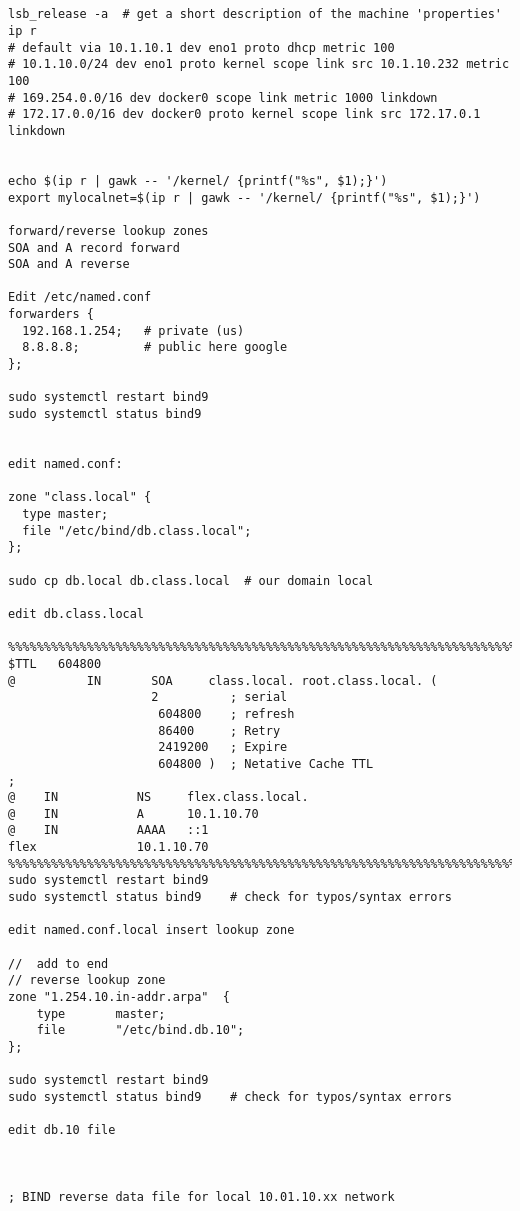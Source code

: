 \begingroup \fontsize{10pt}{10pt}
\selectfont
\begin{verbatim} 


lsb_release -a  # get a short description of the machine 'properties'
ip r
# default via 10.1.10.1 dev eno1 proto dhcp metric 100 
# 10.1.10.0/24 dev eno1 proto kernel scope link src 10.1.10.232 metric 100 
# 169.254.0.0/16 dev docker0 scope link metric 1000 linkdown 
# 172.17.0.0/16 dev docker0 proto kernel scope link src 172.17.0.1 linkdown 


echo $(ip r | gawk -- '/kernel/ {printf("%s", $1);}')
export mylocalnet=$(ip r | gawk -- '/kernel/ {printf("%s", $1);}')

forward/reverse lookup zones
SOA and A record forward
SOA and A reverse 

Edit /etc/named.conf
forwarders {
  192.168.1.254;   # private (us)
  8.8.8.8;         # public here google
};

sudo systemctl restart bind9
sudo systemctl status bind9


edit named.conf:

zone "class.local" {
  type master;
  file "/etc/bind/db.class.local";
};

sudo cp db.local db.class.local  # our domain local

edit db.class.local

%%%%%%%%%%%%%%%%%%%%%%%%%%%%%%%%%%%%%%%%%%%%%%%%%%%%%%%%%%%%%%%%%%%%%%%%%%%%%
$TTL   604800
@          IN       SOA     class.local. root.class.local. (
                    2          ; serial  
                     604800    ; refresh
                     86400     ; Retry
                     2419200   ; Expire
                     604800 )  ; Netative Cache TTL
;
@    IN           NS     flex.class.local.
@    IN           A      10.1.10.70
@    IN           AAAA   ::1
flex              10.1.10.70
%%%%%%%%%%%%%%%%%%%%%%%%%%%%%%%%%%%%%%%%%%%%%%%%%%%%%%%%%%%%%%%%%%%%%%%%%%%%%
sudo systemctl restart bind9
sudo systemctl status bind9    # check for typos/syntax errors

edit named.conf.local insert lookup zone

//  add to end
// reverse lookup zone
zone "1.254.10.in-addr.arpa"  {
    type       master;
    file       "/etc/bind.db.10";
};

sudo systemctl restart bind9
sudo systemctl status bind9    # check for typos/syntax errors

edit db.10 file



; BIND reverse data file for local 10.01.10.xx network


\end{verbatim}
